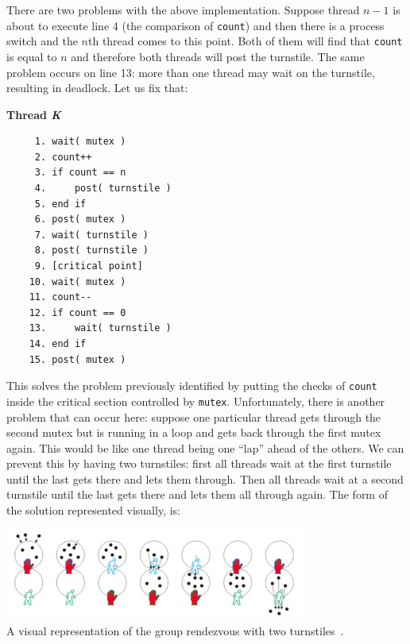 There are two problems with the above implementation. Suppose thread $n-1$ is about to execute line 4 (the comparison of \texttt{count}) and then there is a process switch and the $n$th thread comes to this point. Both of them will find that \texttt{count} is equal to $n$ and therefore both threads will post the turnstile. The same problem occurs on line 13: more than one thread may wait on the turnstile, resulting in deadlock. Let us fix that:


\textbf{Thread \textit{K}}\vspace{-2em}
\begin{verbatim}
	 1. wait( mutex )
	 2. count++
	 3. if count == n
	 4.     post( turnstile )
	 5. end if
	 6. post( mutex )
	 7. wait( turnstile )
	 8. post( turnstile )
	 9. [critical point]
	10. wait( mutex )
	11. count--
	12. if count == 0
	13.     wait( turnstile )
	14. end if
	15. post( mutex )
  \end{verbatim}
\vspace{-2em}

This solves the problem previously identified by putting the checks of \texttt{count} inside the critical section controlled by \texttt{mutex}. Unfortunately, there is another problem that can occur here: suppose one particular thread gets through the second mutex but is running in a loop and gets back through the first mutex again. This would be like one thread being one ``lap'' ahead of the others. We can prevent this by having two turnstiles: first all threads wait at the first turnstile until the last gets there and lets them through. Then all threads wait at a second turnstile until the last gets there and lets them all through again. The form of the solution represented visually, is:

\begin{center}
	\includegraphics[width=0.75\textwidth]{images/reusable-barrier.png}\\
	A visual representation of the group rendezvous with two turnstiles~\cite{mte241}.
\end{center}

